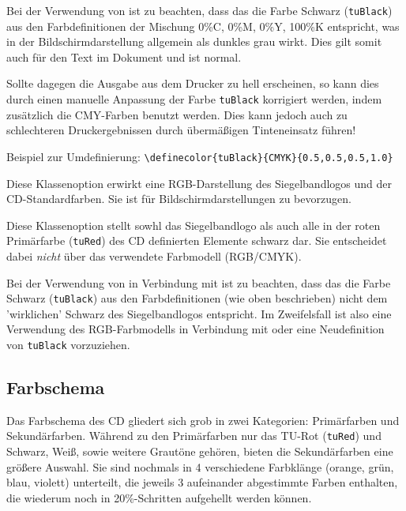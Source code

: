 \begin{important}
  Bei der Verwendung von  ist zu beachten,
  dass das die Farbe Schwarz (\texttt{tuBlack})
  aus den Farbdefinitionen der Mischung 0\%C, 0\%M, 0\%Y, 100\%K entspricht,
  was in der Bildschirmdarstellung allgemein als dunkles grau wirkt. Dies
  gilt somit auch für den Text im Dokument und ist normal.

  Sollte dagegen die Ausgabe aus dem Drucker zu hell erscheinen, so kann dies
  durch einen manuelle Anpassung der Farbe \texttt{tuBlack} korrigiert werden,
  indem zusätzlich die CMY-Farben benutzt werden. Dies kann jedoch auch zu
  schlechteren Druckergebnissen durch übermäßigen Tinteneinsatz führen!
  
  Beispiel zur Umdefinierung:
  \lstinline!\definecolor{tuBlack}{CMYK}{0.5,0.5,0.5,1.0}!
\end{important}

\begin{Declaration}
\end{Declaration}

Diese Klassenoption erwirkt eine RGB-Darstellung des Siegelbandlogos und der
CD-Standardfarben. Sie ist für Bildschirmdarstellungen zu bevorzugen.

\begin{Declaration}
\end{Declaration}

Diese Klassenoption stellt sowhl das Siegelbandlogo als auch alle in der
roten Primärfarbe (\texttt{tuRed}) des CD definierten Elemente schwarz dar.
Sie entscheidet dabei \emph{nicht} über das verwendete Farbmodell (RGB/CMYK).
\begin{important}
  Bei der Verwendung von  in Verbindung mit 
  ist zu beachten, dass das die Farbe Schwarz (\texttt{tuBlack})
  aus den Farbdefinitionen (wie oben beschrieben) nicht dem 'wirklichen' Schwarz
  des Siegelbandlogos entspricht.
  Im Zweifelsfall ist also eine Verwendung des RGB-Farbmodells in Verbindung
  mit  oder eine Neudefinition von \texttt{tuBlack} vorzuziehen.
\end{important}

\subsection{Farbschema}

Das Farbschema des CD gliedert sich grob in zwei Kategorien: Primärfarben
und Sekundärfarben. Während zu den Primärfarben nur das TU-Rot (\texttt{tuRed})
und Schwarz, Weiß, sowie weitere Grautöne gehören, bieten die Sekundärfarben
eine größere Auswahl. Sie sind nochmals in 4 verschiedene Farbklänge
(orange, grün, blau, violett) unterteilt, die jeweils 3 aufeinander
abgestimmte Farben enthalten, die wiederum noch in 20\%-Schritten aufgehellt
werden können.

